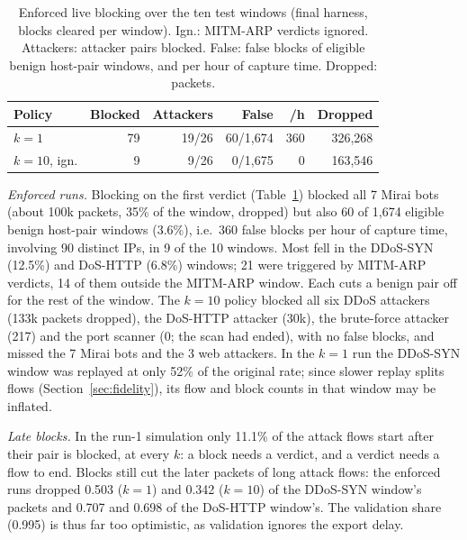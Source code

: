\begin{table}[t]
\centering
\caption{Enforced live blocking over the ten test windows (final harness, blocks cleared per window). Ign.: MITM-ARP verdicts ignored. Attackers: attacker pairs blocked. False: false blocks of eligible benign host-pair windows, and per hour of capture time. Dropped: packets.}
\label{tab:blocking}
\footnotesize
\setlength{\tabcolsep}{3pt}
\begin{tabular}{lrrrrr}
\hline
Policy & Blocked & Attackers & False & /h & Dropped \\
\hline
$k=1$ & 79 & 19/26 & 60/1,674 & 360 & 326,268 \\
$k=10$, ign. & 9 & 9/26 & 0/1,675 & 0 & 163,546 \\
\hline
\end{tabular}
\end{table}

\emph{Enforced runs.} Blocking on the first verdict (Table~\ref{tab:blocking}) blocked all 7 Mirai bots (about 100k packets, 35\% of the window, dropped) but also 60 of 1,674 eligible benign host-pair windows (3.6\%), i.e.\ 360 false blocks per hour of capture time, involving 90 distinct IPs, in 9 of the 10 windows. Most fell in the DDoS-SYN (12.5\%) and DoS-HTTP (6.8\%) windows; 21 were triggered by MITM-ARP verdicts, 14 of them outside the MITM-ARP window. Each cuts a benign pair off for the rest of the window. The $k=10$ policy blocked all six DDoS attackers (133k packets dropped), the DoS-HTTP attacker (30k), the brute-force attacker (217) and the port scanner (0; the scan had ended), with no false blocks, and missed the 7 Mirai bots and the 3 web attackers. In the $k=1$ run the DDoS-SYN window was replayed at only 52\% of the original rate; since slower replay splits flows (Section~\ref{sec:fidelity}), its flow and block counts in that window may be inflated.

\emph{Late blocks.} In the run-1 simulation only 11.1\% of the attack flows start after their pair is blocked, at every $k$: a block needs a verdict, and a verdict needs a flow to end. Blocks still cut the later packets of long attack flows: the enforced runs dropped 0.503 ($k=1$) and 0.342 ($k=10$) of the DDoS-SYN window's packets and 0.707 and 0.698 of the DoS-HTTP window's. The validation share (0.995) is thus far too optimistic, as validation ignores the export delay.
